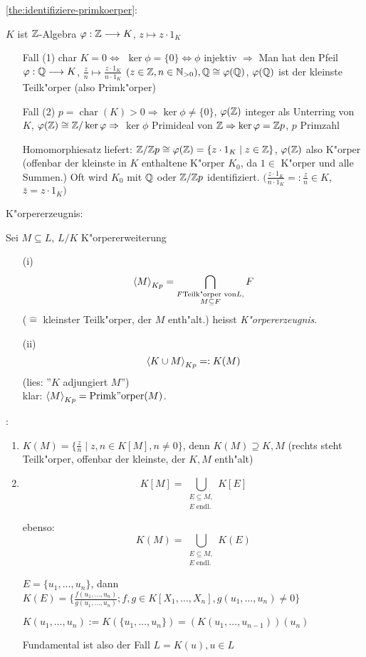 \proof \ref{the:identifiziere-primkoerper}:{
 $K$ ist $\mathbb Z$-Algebra $\varphi:\mathbb Z \longrightarrow K$,
 $z\mapsto z \cdot 1_K$
 \begin{enumerate}
 \item[Fall (1)] char $K=0 \iff$ $\ker \phi=\{0\} \iff \phi$ injektiv $\Rightarrow$ 
 Man hat den Pfeil $\varphi:\mathbb Q \longrightarrow K$, $\frac{z}{n}\mapsto \frac{z\cdot 1_K}{n\cdot 1_K}$
 $(z \in \mathbb Z, n\in \mathbb N_{>0}), \mathbb Q \cong \varphi(\mathbb Q)$,
 $\varphi(\mathbb Q)$ ist der kleinste Teilk"orper (also Primk"orper)
 \item[Fall (2)] $p=\operatorname{char}(K)>0 \Rightarrow \ker \phi \neq \{0\}$,
 $\varphi(\mathbb Z)$ integer als Unterring von $K$, $\varphi(\mathbb Z) \cong \mathbb Z/\ker\varphi \Rightarrow$
 $\ker \phi$ Primideal von $\mathbb Z \Rightarrow \ker \varphi=\mathbb Z p$,
 $p$ Primzahl
 
 Homomorphiesatz liefert: $\mathbb Z/\mathbb Z p \cong \varphi(\mathbb Z)=\{z\cdot 1_K \mid z\in \mathbb Z\}$,
 $\varphi(\mathbb Z)$ also K"orper (offenbar der kleinste in $K$ enthaltene K"orper $K_0$, da $1\in$ 
 K"orper und alle Summen.)
 Oft wird $K_0$ mit $\mathbb Q$ oder $\mathbb Z/\mathbb Z p$ identifiziert.
 $(\frac{z\cdot 1_K}{n\cdot 1_K}=:\frac{z}{n}\in K$, $\bar{z}=z\cdot 1_K)$
 \end{enumerate}
 }
 K"orpererzeugnis:{
 Sei $M\subseteq L$, $L/K$ K"orpererweiterung
 \begin{enumerate}
 \item[(i)] \[{\left\langle M\right\rangle}_{Kp}=\bigcap_{\substack{F \text{Teilk"orper von} L,\\ M\subseteq F}} F\]
 ($\hat=$ kleinster Teilk"orper, der $M$ enth"alt.) heisst \emph{K"orpererzeugnis}.
 \item[(ii)] \[{\left\langle K\cup M\right\rangle}_{Kp}=:K(M)\]
 (lies: ''$K$ adjungiert $M$'')\\
 klar: ${\left\langle M\right\rangle}_{Kp}=\operatorname{Primk"orper}(M)$.
 \end{enumerate} } 
\remark{}:{\begin{enumerate}
 \item $K(M)=\{\frac{z}{n}\mid z,n\in K[M],n\neq 0\}$, denn $K(M)\supseteq K,M$ (rechts steht 
   Teilk"orper, offenbar der kleinste, der $K,M$ enth"alt)
 \item \[K[M]=\bigcup_{\substack{E\subseteq M,\\ E \operatorname{endl.}}} K[E]\]
 
 ebenso: \[K(M)=\bigcup_{\substack{E\subseteq M,\\ E\operatorname{endl.}}} K(E)\]
 
 $E=\{u_1, \ldots, u_n \}$, dann $K(E)=\{\frac{f(u_1,\ldots, u_n)}{g(u_1,\ldots, u_n)};
 f,g\in K[X_1,\ldots, X_n], g(u_1, \ldots, u_n)\neq 0\}$
 
 $K(u_1, \ldots, u_n):= K(\{u_1, \ldots, u_n\})=(K(u_1, \ldots, u_{n-1}))(u_n)$
 
 Fundamental ist also der Fall $L=K(u), u\in L$
 \end{enumerate}}
